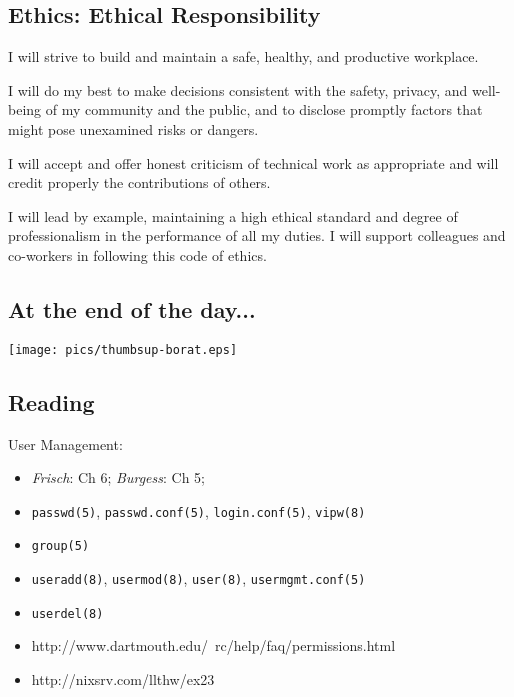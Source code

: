 \documentclass[xga]{xdvislides}
\begin{document}
\subsection{Ethics: Ethical Responsibility}
\vfill
\begin{center}
I will strive to build and maintain a safe, healthy, and productive
workplace. \\
\vspace{.5in}

I will do my best to make decisions consistent with the safety, privacy,
and well-being of my community and the public, and to disclose promptly
factors that might pose unexamined risks or dangers. \\
\vspace{.5in}

I will accept and offer honest criticism of technical work as appropriate
and will credit properly the contributions of others. \\
\vspace{.5in}

I will lead by example, maintaining a high ethical standard and degree
of professionalism in the performance of all my duties. I will support
colleagues and co-workers in following this code of ethics.

\end{center}
\vfill

\subsection{At the end of the day...}
\begin{center}
	\texttt{[image: pics/thumbsup-borat.eps]}
\end{center}

\subsection{Reading}
User Management:
\begin{itemize}
	\item {\em Frisch}: Ch 6; {\em Burgess}: Ch 5;
	\item \verb+passwd(5)+, \verb+passwd.conf(5)+, \verb+login.conf(5)+,
		\verb+vipw(8)+
	\item \verb+group(5)+
	\item \verb+useradd(8)+, \verb+usermod(8)+, \verb+user(8)+,
		\verb+usermgmt.conf(5)+
	\item \verb+userdel(8)+
\end{itemize}
\vspace{.5in}
\begin{itemize}
	\item http://www.dartmouth.edu/~rc/help/faq/permissions.html
	\item http://nixsrv.com/llthw/ex23
\end{itemize}
\end{document}
